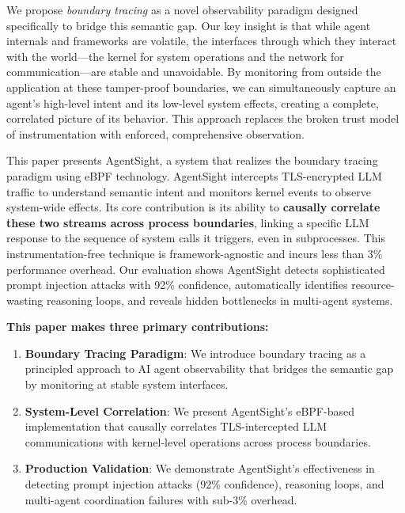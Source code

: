 We propose \emph{boundary tracing} as a novel observability paradigm designed specifically to bridge this semantic gap. Our key insight is that while agent internals and frameworks are volatile, the interfaces through which they interact with the world—the kernel for system operations and the network for communication—are stable and unavoidable. By monitoring from outside the application at these tamper-proof boundaries, we can simultaneously capture an agent's high-level intent and its low-level system effects, creating a complete, correlated picture of its behavior. This approach replaces the broken trust model of instrumentation with enforced, comprehensive observation.

This paper presents AgentSight, a system that realizes the boundary tracing paradigm using eBPF technology. AgentSight intercepts TLS-encrypted LLM traffic to understand semantic intent and monitors kernel events to observe system-wide effects. Its core contribution is its ability to \textbf{causally correlate these two streams across process boundaries}, linking a specific LLM response to the sequence of system calls it triggers, even in subprocesses. This instrumentation-free technique is framework-agnostic and incurs less than 3\% performance overhead. Our evaluation shows AgentSight detects sophisticated prompt injection attacks with 92\% confidence, automatically identifies resource-wasting reasoning loops, and reveals hidden bottlenecks in multi-agent systems.

\textbf{This paper makes three primary contributions:}

\begin{enumerate}
\item \textbf{Boundary Tracing Paradigm}: We introduce boundary tracing as a principled approach to AI agent observability that bridges the semantic gap by monitoring at stable system interfaces.

\item \textbf{System-Level Correlation}: We present AgentSight's eBPF-based implementation that causally correlates TLS-intercepted LLM communications with kernel-level operations across process boundaries.

\item \textbf{Production Validation}: We demonstrate AgentSight's effectiveness in detecting prompt injection attacks (92\% confidence), reasoning loops, and multi-agent coordination failures with sub-3\% overhead.
\end{enumerate}
